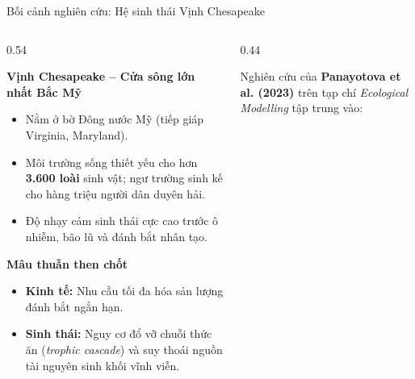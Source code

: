 \documentclass[aspectratio=169, 10pt]{beamer}
\begin{document}
\begin{frame}{Bối cảnh nghiên cứu: Hệ sinh thái Vịnh Chesapeake}
  \begin{columns}[c]
    \begin{column}{0.54\textwidth}
      \begin{block}{\textbf{Vịnh Chesapeake -- Cửa sông lớn nhất Bắc Mỹ}}
        \footnotesize
        \begin{itemize}
          \item Nằm ở bờ Đông nước Mỹ (tiếp giáp Virginia, Maryland).
          \item Môi trường sống thiết yếu cho hơn \textbf{3.600 loài} sinh vật; ngư trường sinh kế cho hàng triệu người dân duyên hải.
          \item Độ nhạy cảm sinh thái cực cao trước ô nhiễm, bão lũ và đánh bắt nhân tạo.
        \end{itemize}
      \end{block}

      \vspace{0.1cm}

      \begin{block}{\textbf{Mâu thuẫn then chốt}}
        \footnotesize
        \begin{itemize}
          \item \textbf{Kinh tế:} Nhu cầu tối đa hóa sản lượng đánh bắt ngắn hạn.
          \item \textbf{Sinh thái:} Nguy cơ đổ vỡ chuỗi thức ăn (\textit{trophic cascade}) và suy thoái nguồn tài nguyên sinh khối vĩnh viễn.
        \end{itemize}
      \end{block}
    \end{column}

    \begin{column}{0.44\textwidth}
      \begin{tcolorbox}[colback=OceanLight, colframe=OceanNavy, arc=2mm, title={\centering \textbf{Cặp loài tương tác trọng yếu}}]
        \footnotesize
        Nghiên cứu của \textbf{Panayotova et al. (2023)} trên tạp chí \textit{Ecological Modelling} tập trung vào:
        \vspace{0.15cm}
        

\end{tcolorbox}
\end{column}
\end{columns}
\end{frame}
\end{document}
